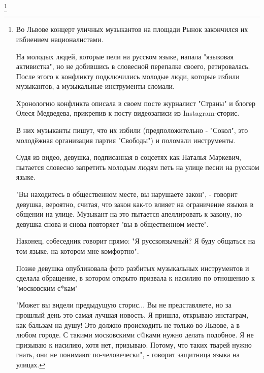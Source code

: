  
 
 
 
 
\footnote{%
Во Львове концерт уличных музыкантов на площади Рынок закончился их избиением
националистами.

На молодых людей, которые пели на русском языке, напала "языковая активистка",
но не добившись в словесной перепалке своего, ретировалась. После этого к
конфликту подключились молодые люди, которые избили музыкантов, а музыкальные
инструменты сломали.

Хронологию конфликта описала в своем посте журналист "Страны" и блогер Олеся
Медведева, прикрепив к посту видеозаписи из Instagram-сторис.

В них музыканты пишут, что их избили (предположительно - "Сокол", это
молодёжная организация партия "Свободы") и поломали инструменты.

Судя из видео, девушка, подписанная в соцсетях как Наталья Маркевич, пытается
словесно запретить молодым людям петь на улице песни на русском языке.

"Вы находитесь в общественном месте, вы нарушаете закон", - говорит девушка,
вероятно, считая, что закон как-то влияет на ограничение языков в общении на
улице. Музыкант на это пытается апеллировать к закону, но девушка снова и снова
повторяет "вы в общественном месте".

Наконец, собеседник говорит прямо: "Я русскоязычный? Я буду общаться на том
языке, на котором мне комфортно".

Позже девушка опубликовала фото разбитых музыкальных инструментов и сделала
обращение, в котором открыто призвала к насилию по отношению к "московским
с*кам"

"Может вы видели предыдущую сторис... Вы не представляете, но за прошлый день
это самая лучшая новость. Я пришла, открываю инстаграм, как бальзам на душу!
Это должно происходить не только во Львове, а в любом городе. С такими
московскими с@ками нужно делать подобное. Я не призываю к насилию, хотя нет,
призываю. Потому, что таких тварей нужно гнать, они не понимают
по-человечески", - говорит защитница языка на улицах.
}
